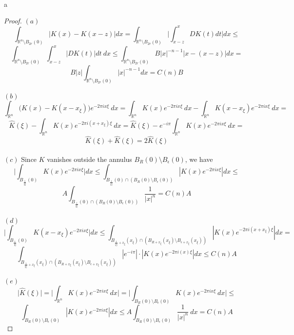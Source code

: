 a\documentclass[12pt]{article}
\newenvironment{exercise}[2][Exercise]{\begin{trivlist}
\item[\hskip \labelsep {\bfseries #1}\hskip \labelsep {\bfseries #2.}]}{\end{trivlist}}
\begin{document}
\begin{proof}
  $(a)$
  $$\int_{\mathbb{R}^n \setminus B_{2r}(0)} |K(x) - K(x-z)| dx = \int_{\mathbb{R}^n \setminus B_{2r}(0)} \Big| \int_{x-z}^{x} DK(t) dt \Big| dx \le$$
  $$\int_{\mathbb{R}^n \setminus B_{2r}(0)} \int_{x-z}^{x} \Big|DK(t)\Big| dt\ dx \le \int_{\mathbb{R}^n \setminus B_{2r}(0)} B |x|^{-n-1} |x - (x-z)| dx =$$
  $$B |z| \int_{\mathbb{R}^n \setminus B_{2r}(0)} |x|^{-n-1}dx = C(n)B$$\\
  $(b)$
  $$\int_{\mathbb{R}^n} \Big( K(x) - K(x - x_{\xi}) \Big) e^{-2 \pi i x \xi}\ dx = \int_{\mathbb{R}^n} K(x) e^{-2 \pi i x \xi}\ dx - \int_{\mathbb{R}^n} K(x-x_\xi) e^{-2 \pi i x \xi}\ dx =$$
  $$\hat{K}(\xi) - \int_{\mathbb{R}^n} K(x) e^{-2 \pi i (x + x_\xi) \xi}\ dx = \hat{K}(\xi) - e^{-i \pi} \int_{\mathbb{R}^n} K(x) e^{-2 \pi i x \xi}\ dx =$$
  $$\hat{K}(\xi) + \hat{K}(\xi) = 2 \hat{K}(\xi)$$\\
  $(c)$ Since $K$ vanishes outside the annulus $B_R(0) \setminus B_\epsilon(0)$, we have
  $$\Big| \int_{B_\frac{1}{|\xi|}(0)} K(x)e^{-2 \pi i x \xi} \Big| dx \le \int_{B_\frac{1}{|\xi|}(0) \cap  (B_R(0) \setminus B_\epsilon(0))} |K(x)e^{-2 \pi i x \xi}| dx \le$$
  $$A \int_{B_\frac{1}{|\xi|}(0) \cap  (B_R(0) \setminus B_\epsilon(0))} \dfrac{1}{|x|^n} = C(n)A$$\\
  $(d)$
  $$\Big| \int_{B_\frac{1}{|\xi|}(0)} K(x-x_\xi)e^{-2 \pi i x \xi} \Big| dx \le \int_{B_{\frac{1}{|\xi|}+x_\xi}(x_\xi) \cap  (B_{R+x_\xi}(x_\xi) \setminus B_{\epsilon+x_\xi}(x_\xi))} |K(x)e^{-2 \pi i (x+x_\xi) \xi}| dx =$$ $$\int_{B_{\frac{1}{|\xi|}+x_\xi}(x_\xi) \cap (B_{R+x_\xi}(x_\xi) \setminus B_{\epsilon+x_\xi}(x_\xi))} |e^{-i \pi}| \cdot |K(x)e^{-2 \pi i (x) \xi}| dx \le C(n) A$$\\
  $(e)$
  $$\Big| \hat{K}(\xi) \Big| = \Big| \int_{\mathbb{R}^n} K(x) e^{-2 \pi i x \xi}\ dx \Big| = \Big| \int_{B_R(0) \setminus B_\epsilon(0)} K(x) e^{-2 \pi i x \xi}\ dx \Big| \le$$
  $$\int_{B_R(0) \setminus B_\epsilon(0)} |K(x) e^{-2 \pi i x \xi}| dx \le A \int_{B_R(0) \setminus B_\epsilon(0)} \frac{1}{|x|^n}\ dx = C(n) A$$
\end{proof}

\begin{exercise}{3}
\end{exercise}
\end{document}
